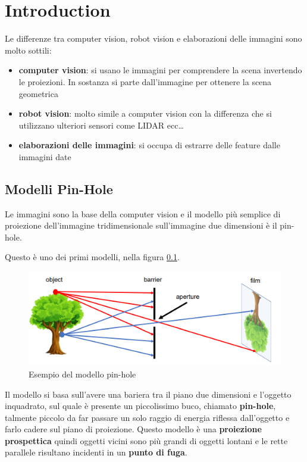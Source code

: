 \chapter*{Introduction}

Le differenze tra computer vision, robot vision e elaborazioni delle immagini 
sono molto sottili:
\begin{itemize}
    \item \textbf{computer vision}: si usano le immagini per comprendere la scena 
    invertendo le proiezioni. In sostanza si parte dall'immagine per ottenere la 
    scena geometrica
    \item \textbf{robot vision}: molto simile a computer vision con la differenza 
    che si utilizzano ulteriori sensori come LIDAR ecc\dots
    \item \textbf{elaborazioni delle immagini}: si occupa di estrarre delle feature 
    dalle immagini date
\end{itemize}

\section{Modelli Pin-Hole}
Le immagini sono la base della computer vision e il modello più semplice di 
proiezione dell'immagine tridimensionale sull'immagine due dimensioni è il pin-hole.

Questo è uno dei primi modelli, nella figura \ref{fig:pin_hole}.
\begin{figure}
    \centering
    \includegraphics*[]{./figure/pin-hole.png}
    \caption{Esempio del modello pin-hole}
    \label{fig:pin_hole}
\end{figure}

Il modello si basa sull'avere una bariera tra il piano due dimensioni e l'oggetto
inquadrato, sul quale è presente un piccolissimo buco, chiamato \textbf{pin-hole},
talmente piccolo da far passare un solo raggio di energia riflessa dall'oggetto e
farlo cadere sul piano di proiezione. Questo modello è una \textbf{proiezione prospettica}
quindi oggetti vicini sono più grandi di oggetti lontani e le rette parallele risultano 
incidenti in un \textbf{punto di fuga}.

